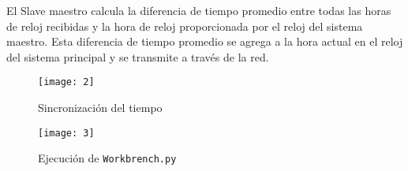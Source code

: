 El Slave maestro calcula la diferencia de tiempo promedio entre todas las horas
de reloj recibidas y la hora de reloj proporcionada por el reloj del sistema
maestro. Esta diferencia de tiempo promedio se agrega a la hora actual en el
reloj del sistema principal y se transmite a través de la red.

\begin{figure}[H]
  \centering
  \texttt{[image: 2]}
  \caption{Sincronización del tiempo}\label{fig:2}
\end{figure}

\begin{figure}[H]
  \centering
  \texttt{[image: 3]}
  \caption{Ejecución de \texttt{Workbrench.py}}\label{fig:3}
\end{figure}
